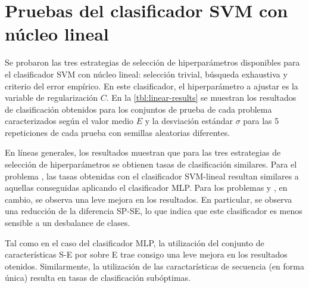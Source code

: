 \section{Pruebas del clasificador SVM con núcleo lineal}
Se probaron las tres estrategias de selección de hiperparámetros
disponibles para el clasificador SVM con núcleo lineal: selección
trivial, búsqueda exhaustiva y criterio del error empírico. En este
clasificador, el hiperparámetro a ajustar es la variable de
regularización $C$.  En la \autoref{tbl:linear-results} se muestran
los resultados de clasificación obtenidos para los conjuntos de prueba
de cada problema caracterizados según el valor medio $E$ y la
desviación estándar $\sigma$ para las 5 repeticiones de cada prueba
con semillas aleatorias diferentes.

En líneas generales, los resultados muestran que para las tres
estrategias de selección de hiperparámetros se obtienen tasas de
clasificación similares.  Para el problema \tripletsvm{}, las tasas
obtenidas con el clasificador SVM-lineal resultan similares a aquellas
conseguidas aplicando el clasificador MLP. Para los problemas
\mipred{} y \micropred{}, en cambio, se observa una leve mejora en los
resultados. En particular, se observa una reducción de la diferencia
SP-SE, lo que indica que este clasificador es menos sensible a un
desbalance de clases.

Tal como en el caso del clasificador MLP, la utilización del conjunto
de características S-E por sobre E trae consigo una leve mejora en los
resultados otenidos. Similarmente, la utilización de las
caractarísticas de secuencia (en forma única) resulta en tasas de
clasificación subóptimas.